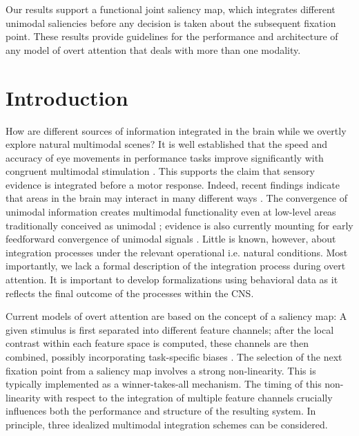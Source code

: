 Our results support a functional joint saliency map, which integrates
different unimodal saliencies before any decision is taken about the
subsequent fixation point. These results provide guidelines for the
performance and architecture of any model of overt attention that deals
with more than one modality. 

\section{Introduction}

How are different sources of information integrated in the brain while we
overtly explore natural multimodal scenes? It is well established that the
speed and accuracy of eye movements in performance tasks improve
significantly with congruent multimodal stimulation \citep{corneil1996a,
corneil2002a, arndt2003a}. This supports the claim that sensory evidence is
integrated before a motor response. Indeed, recent findings indicate that
areas in the brain may interact in many different ways \citep{driver2000a,
macaluso2005a}. The convergence of unimodal information creates multimodal
functionality \citep{meredith1986a, beauchamp2004a} even at low-level areas
traditionally conceived as unimodal \citep{macaluso2000a, calvert1997a,
ghazanfar2005a}; evidence is also currently mounting for early feedforward
convergence of unimodal signals \citep{molholm2002a, fu2003a, foxe2005a,
kayser2005b}. Little is known, however, about integration processes under
the relevant operational \textemdash i.e. natural \textemdash conditions.
Most importantly, we lack a formal description of the integration process
during overt attention. It is important to develop formalizations using
behavioral data as it reflects the final outcome of the processes within
the CNS.  

Current models of overt attention are based on the concept of a saliency
map: A given stimulus is first separated into different feature channels;
after the local contrast within each feature space is computed, these
channels are then combined, possibly incorporating task-specific biases
\citep{koch1985a, itti2001a, parkhurst2002a, peters2005a}. The selection of
the next fixation point from a saliency map involves a strong
non-linearity. This is typically implemented as a winner-takes-all
mechanism. The timing of this non-linearity with respect to the integration
of multiple feature channels crucially influences both the performance and
structure of the resulting system. In principle, three idealized multimodal
integration schemes can be considered. 

